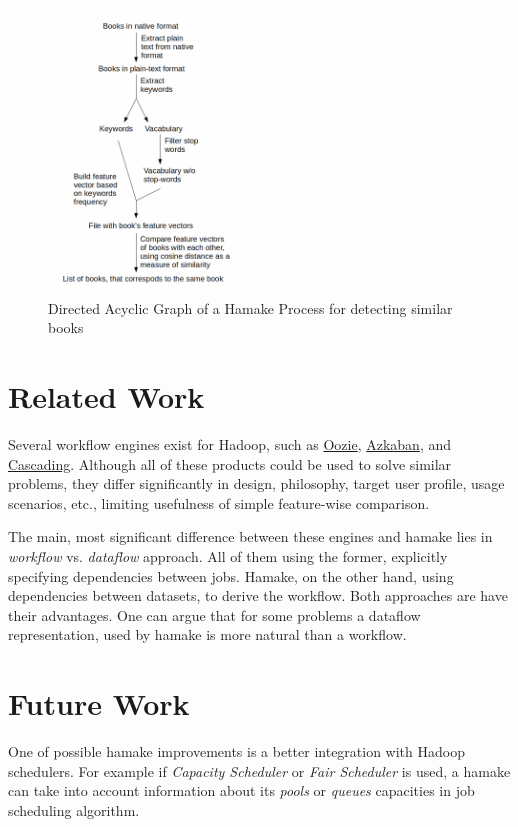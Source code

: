 \documentclass[10pt,conference,letterpaper]{IEEEtran}
\begin{document}
\begin{figure}[htp]
\centering
\includegraphics[width=0.45\textwidth]{SimilarityAlgDAG.png}
\caption{Directed Acyclic Graph of a Hamake Process for detecting similar books}
\label{fig:SimilarityAlgDAG}
\end{figure}

\section{Related Work}

Several workflow engines exist for Hadoop, such as
\href{http://github.com/tucu00/oozie1}{Oozie},
\href{http://sna-projects.com/azkaban/}{Azkaban}, and
\href{http://www.cascading.org/}{Cascading}.  Although all of these
products could be used to solve similar problems, they differ
significantly in design, philosophy, target user profile, usage
scenarios, etc., limiting usefulness of simple feature-wise
comparison.

The main, most significant difference between these engines and hamake
lies in \textit{workflow} vs. \textit{dataflow} approach. All of them
using the former, explicitly specifying dependencies between
jobs. Hamake, on the other hand, using dependencies between datasets,
to derive the workflow. Both approaches are have their advantages. One
can argue that for some problems a dataflow representation, used by
hamake is more natural than a workflow.

\section{Future Work}

One of possible hamake improvements is a better integration with
Hadoop schedulers. For example if \textit{Capacity Scheduler} or
\textit{Fair Scheduler} is used, a hamake can take into account
information about its \textit{pools} or \textit{queues} capacities in
job scheduling algorithm.
\end{document}
